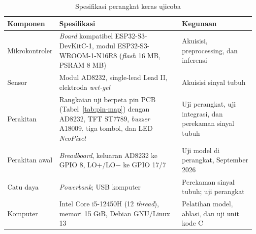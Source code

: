 \begin{table}[!ht]
  \centering
  \caption{Spesifikasi perangkat keras ujicoba}
  \label{tab:perangkat-keras-uji}
  \setlength{\tabcolsep}{4pt}
  \renewcommand{\arraystretch}{1.15}
  \small
  \begin{tabularx}{\linewidth}{>{\RaggedRight\arraybackslash}p{2.4cm}>{\RaggedRight\arraybackslash}X>{\RaggedRight\arraybackslash}X}
    \toprule
    \textbf{Komponen} & \textbf{Spesifikasi} & \textbf{Kegunaan} \\
    \midrule
    Mikrokontroler & \textit{Board} kompatibel ESP32-S3-DevKitC-1, modul ESP32-S3-WROOM-1-N16R8 (\textit{flash} 16 MB, PSRAM 8 MB) & Akuisisi, preprocessing, dan inferensi \\
    Sensor & Modul AD8232, single-lead Lead II, elektroda \textit{wet-gel} & Akuisisi sinyal tubuh \\
    Perakitan & Rangkaian uji berpeta pin PCB (Tabel~\ref{tab:pin-map}) dengan AD8232, TFT ST7789, \textit{buzzer} A18009, tiga tombol, dan LED \textit{NeoPixel} & Uji perangkat, uji integrasi, dan perekaman sinyal tubuh \\
    Perakitan awal & \textit{Breadboard}, keluaran AD8232 ke GPIO 8, LO+/LO$-$ ke GPIO 17/7 & Uji model di perangkat, September 2026 \\
    Catu daya & \textit{Powerbank}; USB komputer & Perekaman sinyal tubuh; uji perangkat \\
    Komputer & Intel Core i5-12450H (12 \textit{thread}), memori 15 GiB, Debian GNU/Linux 13 & Pelatihan model, ablasi, dan uji unit kode C \\
    \bottomrule
  \end{tabularx}
  \par\vspace{2pt}{\footnotesize\raggedright Keterangan: dua catu daya pada baris Catu daya berpasangan urut dengan dua kegunaannya.\par}
\end{table}

